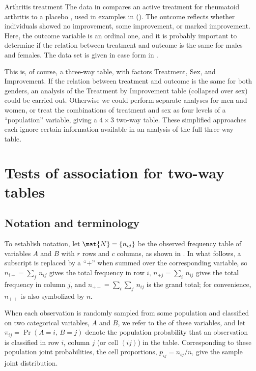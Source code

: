 \documentclass[11pt]{book}\usepackage[]{graphicx}\usepackage[]{color}
\begin{document}
\begin{Example}[arthrit1]{Arthritis treatment}
The data in  compares an active treatment for rheumatoid
arthritis to a placebo
\citep{KochEdwards:88}, used in examples in 
().
The outcome reflects
whether individuals showed no improvement, some improvement, or
marked improvement.
Here, the outcome variable is an ordinal one, and it is probably
important to determine if the relation between treatment and outcome
is the same for males and females.
The data set is given in case form in .


This is, of course, a three-way table, with factors
Treatment, Sex, and Improvement.
If the relation between treatment and outcome is the same for
both genders, an analysis of the Treatment by Improvement
table (collapsed over sex) could be carried out.
Otherwise we could perform separate analyses for
men and women, or
treat the combinations of treatment and sex as four levels of
a ``population'' variable, giving a $4 \times 3$ two-way table.
These simplified approaches each ignore certain information
available in
an analysis of the full three-way table.
\end{Example}

\section{Tests of association for two-way tables}\label{sec:twoway-tests}

\subsection{Notation and terminology}\label{sec:twoway-notation}
To establish notation, let \(\mat{N}  =  \{  n_{ij}  \}\) be the
observed frequency table of variables \(A\) and \(B\) with \(r\) rows
and \(c\) columns, as shown in .
In what follows, a subscript is replaced by a ``$+$''
when summed over the corresponding variable, so \(n_{i+}  =  \sum_j \,
n_{ij}\) gives the total frequency in row \(i\), \(n_{+j}  =  \sum_i \,
n_{ij}\) gives the total frequency in column \(j\), and \(n_{++}  =
\sum_i \sum_j \,  n_{ij}\) is the grand total; for convenience,
\(n_{++}\) is also symbolized by \(n\).


When each observation is randomly sampled from some population
and classified on two categorical variables, $A$ and $B$,
we refer to the  of these variables,
and let $\pi_{ij} = \Pr(A=i,\,B=j)$ denote the population
probability that
an observation is classified in row $i$, column $j$ (or cell $(ij)$)
in the table.
Corresponding to these population joint probabilities, the
cell proportions, $p_{ij} = n_{ij} / n$, give the sample joint
distribution.
\end{document}
